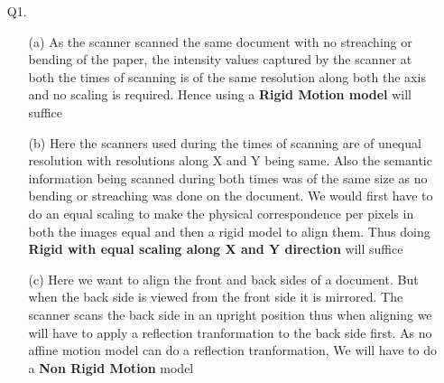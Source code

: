 \documentclass[11pt]{article}
\begin{document}
\maketitle

\begin{enumerate}
\item [Q1.]
\begin{enumerate}
\item [(a)] As the scanner scanned the same document with no streaching or bending of the paper, the intensity values captured by the scanner at both the times of scanning is of the same resolution along both the axis and no scaling is required. Hence using a \textbf{Rigid Motion model} will suffice

\item [(b)] Here the scanners used during the times of scanning are of unequal resolution with resolutions along X and Y being same. Also the semantic information being scanned during both times was of the same size as no bending or streaching was done on the document. We would first have to do an equal scaling to make the physical correspondence per pixels in both the images equal and then a rigid model to align them. Thus doing \textbf{Rigid with equal scaling along X and Y direction} will suffice

\item [(c)] Here we want to align the front and back sides of a document. But when the back side is viewed from the front side it is mirrored. The scanner scans the back side in an upright position thus when aligning we will have to apply a reflection tranformation to the back side first. As no affine motion model can do a reflection tranformation, We will have to do a \textbf{Non Rigid Motion} model

\end{enumerate}

\end{enumerate}
\end{document}
